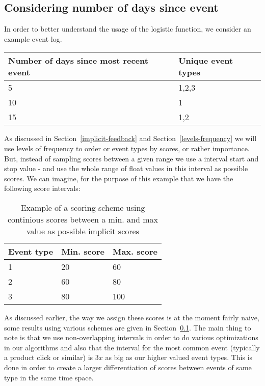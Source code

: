 \subsection{Considering number of days since event}

In order to better understand the usage of the logistic function, we consider
an example event log.

\begin{table}[H]
  \centering
  \label{events-example}
  \begin{tabular}{p{4cm}m{3cm}}
    \toprule
    Number of days since most recent event & Unique event types \\
    \midrule
    5 & 1,2,3 \\
    10 & 1 \\
    15 & 1,2 \\
    \bottomrule
  \end{tabular}
\end{table}

As discussed in Section~\ref{implicit-feedback} and
Section~\ref{levels-frequency} we will use levels of frequency to order or
event types by scores, or rather importance. But, instead of sampling scores
between a given range we use a interval start and stop value - and use the
whole range of float values in this interval as possible scores. We can
imagine, for the purpose of this example that we have the following score
intervals:

\begin{table}[H]
  \centering
  \begin{tabular}{lll}
    \toprule
    Event type & Min. score & Max. score \\
    \midrule
    1 & 20 & 60 \\
    2 & 60 & 80 \\
    3 & 80 & 100 \\
    \bottomrule
  \end{tabular}
  \caption{Example of a scoring scheme using continious scores between a min.
  and max value as possible implicit scores}
  \label{implicit-example-scores}
\end{table}

As discussed earlier, the way we assign these scores is at the moment fairly
naive, some results using various schemes are given in Section~\ref{}. The main
thing to note is that we use non-overlapping intervals in order to do various
optimizations in our algorithms and also that the interval for the most common
event (typically a product click or similar) is $3x$ as big as our higher
valued event types. This is done in order to create a larger differentiation
of scores between events of same type in the same time space.

